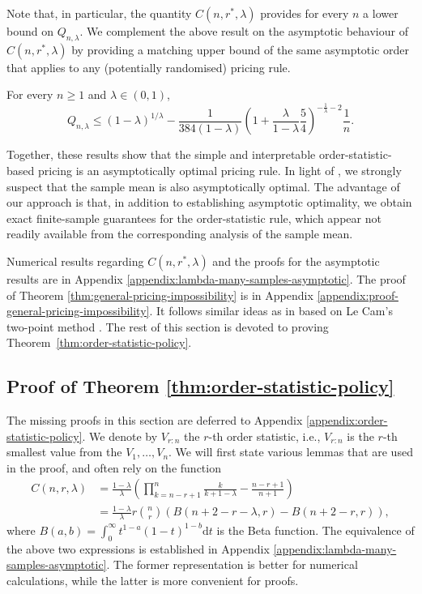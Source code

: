 \documentclass[11pt]{article}
\begin{document}
Note that, in particular, the quantity $C(n,r^*,\lambda)$ provides for every $n$ a lower bound on $Q_{n,\lambda}$. We complement the above result on the asymptotic behaviour of $C(n,r^*,\lambda)$ by providing a matching upper bound of the same asymptotic order that applies to any (potentially randomised) pricing rule.
\begin{theorem}
    \label{thm:general-pricing-impossibility}
    For every $n\ge 1$ and $\lambda\in(0,1)$,
    $$
    Q_{n,\lambda}\le(1-\lambda)^{1/\lambda}-\frac{1}{384\left(1-\lambda\right)}\left(1+\frac{\lambda}{1-\lambda}\frac{5}{4}\right)^{-\frac{1}{\lambda}-2}\frac{1}{n}.
    $$
\end{theorem}
Together, these results show that the simple and interpretable order-statistic-based pricing is an asymptotically optimal pricing rule. In light of \citet[Proposition 4]{schweizer2019performance}, we strongly suspect that the sample mean is also asymptotically optimal. The advantage of our approach is that, in addition to establishing asymptotic optimality, we obtain exact finite-sample guarantees for the order-statistic rule, which appear not readily available from the corresponding analysis of the sample mean.

Numerical results regarding $C(n,r^*,\lambda)$ and the proofs for the asymptotic results are in Appendix \ref{appendix:lambda-many-samples-asymptotic}.
The proof of Theorem \ref{thm:general-pricing-impossibility} is in Appendix \ref{appendix:proof-general-pricing-impossibility}. It follows similar ideas as in \cite{huang2018making} based on Le Cam's two-point method \cite{tsybakov2008lower}.
The rest of this section is devoted to proving Theorem~\ref{thm:order-statistic-policy}.

\subsection{Proof of Theorem \ref{thm:order-statistic-policy}}
The missing proofs in this section are deferred to Appendix \ref{appendix:order-statistic-policy}.
We denote by $V_{r:n}$ the $r$-th order statistic, i.e., $V_{r:n}$ is the $r$-th smallest value from the $V_1,\dots,V_n$. We will first state various lemmas that are used in the proof, and often rely on the function
\begin{align}
        C(n,r,\lambda)&=\frac{1-\lambda}{\lambda}\left(\prod_{k=n-r+1}^n\frac{k}{k+1-\lambda}-\frac{n-r+1}{n+1}\right)\nonumber\\
        &=
        \frac{1-\lambda}{\lambda}r\binom{n}{r}\left(B(n+2-r-\lambda, r)-B(n+2-r, r)\right),
        \label{eq:C-n-r-lambda}
\end{align}
where $B(a,b) =\int_0^\infty t^{1-a}(1-t)^{1-b}\mathrm{d}t$ is the Beta function.
The equivalence of the above two expressions is established in Appendix \ref{appendix:lambda-many-samples-asymptotic}.
The former representation is better for numerical calculations, while the latter is more convenient for proofs.
\end{document}
